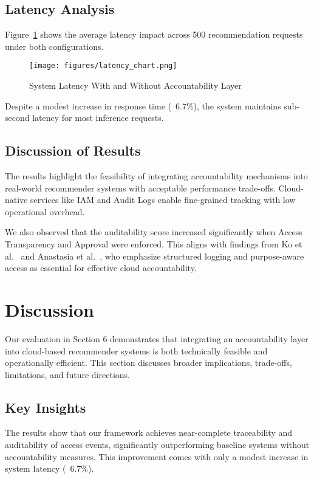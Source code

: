 \documentclass[acmsmall]{acmart}
\begin{document}
\subsection{Latency Analysis}

Figure~\ref{fig:latency_chart} shows the average latency impact across 500 recommendation requests under both configurations.

\begin{figure}[h]
    \centering
    \texttt{[image: figures/latency\_chart.png]}
    \caption{System Latency With and Without Accountability Layer}
    \label{fig:latency_chart}
\end{figure}

Despite a modest increase in response time (~6.7\%), the system maintains sub-second latency for most inference requests.

\subsection{Discussion of Results}

The results highlight the feasibility of integrating accountability mechanisms into real-world recommender systems with acceptable performance trade-offs. Cloud-native services like IAM and Audit Logs enable fine-grained tracking with low operational overhead.

We also observed that the auditability score increased significantly when Access Transparency and Approval were enforced. This aligns with findings from Ko et al.~\cite{ko2011cloud} and Anastasia et al.~\cite{anastasia2021accountability}, who emphasize structured logging and purpose-aware access as essential for effective cloud accountability.

\section{Discussion}

Our evaluation in Section 6 demonstrates that integrating an accountability layer into cloud-based recommender systems is both technically feasible and operationally efficient. This section discusses broader implications, trade-offs, limitations, and future directions.

\subsection{Key Insights}

The results show that our framework achieves near-complete traceability and auditability of access events, significantly outperforming baseline systems without accountability measures. This improvement comes with only a modest increase in system latency (~6.7\%).
\end{document}
